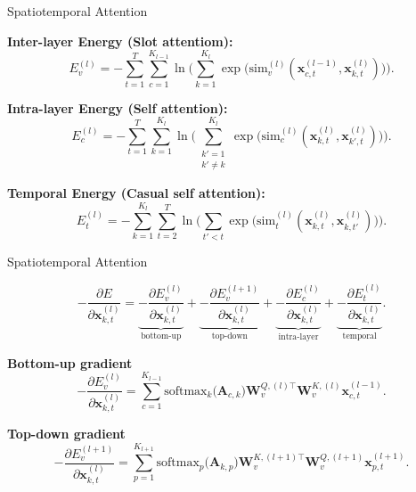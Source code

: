 \documentclass{beamer}
\begin{document}
\begin{frame}{Spatiotemporal Attention}

    \textbf{Inter-layer Energy (Slot attentiom):}
    \[
    E_{v}^{(l)}
    =
    -\sum_{t=1}^T
    \sum_{c=1}^{K_{l-1}}
    \ln \Biggl(
    \sum_{k=1}^{K_l}
    \exp\bigl(\mathrm{sim}_{v}^{(l)}(\bm{x}_{c,t}^{(l-1)}, \bm{x}_{k,t}^{(l)})\bigr)
    \Biggr).
    \]

    \textbf{Intra-layer Energy (Self attention):}
    \[
    E_{c}^{(l)}
    =
    -\sum_{t=1}^T
    \sum_{k=1}^{K_l}
    \ln \Biggl(
    \sum_{\substack{k'=1 \\ k'\neq k}}^{K_l}
    \exp\bigl(\mathrm{sim}_{c}^{(l)}(\bm{x}_{k,t}^{(l)}, \bm{x}_{k',t}^{(l)})\bigr)
    \Biggr).
    \]

    \textbf{Temporal Energy (Casual self attention):}
    \[
    E_{t}^{(l)}
    =
    -\sum_{k=1}^{K_l}
    \sum_{t=2}^T
    \ln \Biggl(
    \sum_{t'<t}
    \exp\bigl(\mathrm{sim}_{t}^{(l)}(\bm{x}_{k,t}^{(l)}, \bm{x}_{k,t'}^{(l)})\bigr)
    \Biggr).
    \]

\end{frame}

\begin{frame}{Spatiotemporal Attention}

    \[
    -\frac{\partial E}{\partial \bm{x}_{k,t}^{(l)}} = 
    \underbrace{-\frac{\partial E_{v}^{(l)}}{\partial \bm{x}_{k,t}^{(l)}}}_{\text{bottom-up}} 
    + 
    \underbrace{-\frac{\partial E_{v}^{(l+1)}}{\partial \bm{x}_{k,t}^{(l)}}}_{\text{top-down}} 
    + 
    \underbrace{-\frac{\partial E_{c}^{(l)}}{\partial \bm{x}_{k,t}^{(l)}}}_{\text{intra-layer}} 
    + 
    \underbrace{-\frac{\partial E_{t}^{(l)}}{\partial \bm{x}_{k,t}^{(l)}}}_{\text{temporal}}.
    \]

    \textbf{Bottom-up gradient}
    \[
        -\frac{\partial E_{v}^{(l)}}{\partial \bm{x}_{k,t}^{(l)}}
        =
        \sum_{c=1}^{K_{l-1}}
        \mathrm{softmax}_{k}\bigl(\bm{A}_{c,k}\bigr)
        \bm{W}_{v}^{Q,(l)\top} \bm{W}_{v}^{K,(l)} \bm{x}_{c,t}^{(l-1)}.
    \]

    \textbf{Top-down gradient}
    \[
        -\frac{\partial E_{v}^{(l+1)}}{\partial \bm{x}_{k,t}^{(l)}}
        =
        \sum_{p=1}^{K_{l+1}}
        \mathrm{softmax}_{p}\bigl(\bm{A}_{k,p}\bigr)
        \bm{W}_{v}^{K,(l+1)\top} \bm{W}_{v}^{Q,(l+1)} \bm{x}_{p,t}^{(l+1)}.
        \]
    
    

\end{frame}
\end{document}

